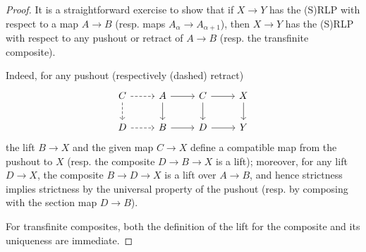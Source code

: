 \documentclass[a4paper,10pt,draft]{article}%
\begin{document}
\begin{proof}
      It is a straightforward exercise to show that
      if $X \to Y$ has the (S)RLP with respect to a map $A \to B$ (resp. maps $A_\alpha \to A_{\alpha +1}$), then
      $X \to Y$ has the (S)RLP with respect to any pushout or retract of $A \to B$ (resp. the transfinite composite).

      Indeed, for any pushout (respectively (dashed) retract)
      \begin{equation}
            \label{LIFTING_EQ}
            \begin{tikzcd}
                  C \arrow[r, dashed] \arrow[d,dashed]
                  &
                  A \arrow[r] \arrow[d]
                  &
                  C \arrow[r] \arrow[d]
                  &
                  X \arrow[d]
                  \\
                  D \arrow[r, dashed]
                  &
                  B \arrow[r]
                  &
                  D \arrow[r]
                  &
                  Y
            \end{tikzcd}
      \end{equation}
      the lift $B \to X$ and the given map $C \to X$ define a compatible map from the pushout to $X$
      (resp. the composite $D \to B \to X$ is a lift);
      moreover, for any lift $D \to X$, the composite $B \to D \to X$ is a lift over $A \to B$,
      and hence strictness implies strictness by the universal property of the pushout
      (resp. by composing with the section map $D \to B$).

      For transfinite composites,
      both the definition of the lift for the composite and its uniqueness are immediate.


\end{proof}
\end{document}
